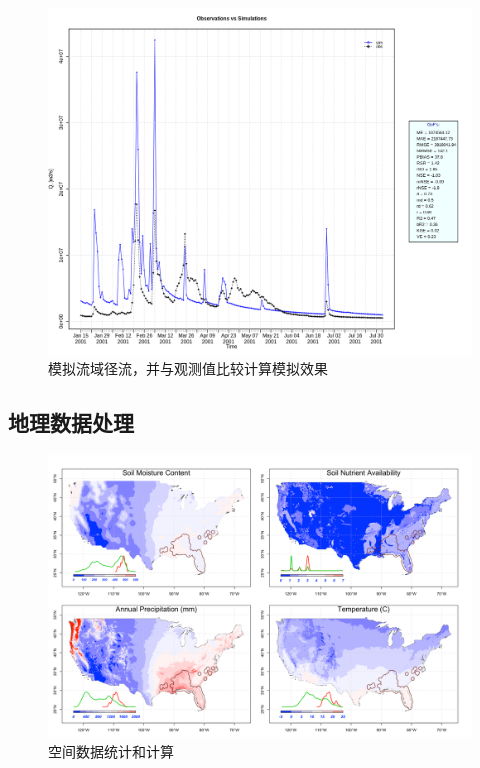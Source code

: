 \documentclass[]{scrbook}
\begin{document}
\begin{figure}
\centering
\includegraphics{Fig/fig5.png}
\caption{模拟流域径流，并与观测值比较计算模拟效果}
\end{figure}

\hypertarget{ux5730ux7406ux6570ux636eux5904ux7406}{%
\subsection*{地理数据处理}\label{ux5730ux7406ux6570ux636eux5904ux7406}}

\begin{figure}
\centering
\includegraphics{Fig/fig1.png}
\caption{空间数据统计和计算}
\end{figure}
\end{document}
